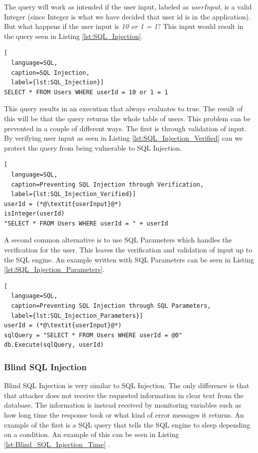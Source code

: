 The query will work as intended if the user input, labeled as \textit{userInput}, is a valid Integer (since Integer is what we have decided that user id is in the application). But what happens if the user input is \textit{10 or 1 = 1}? This input would result in the query seen in Listing \ref{lst:SQL_Injection}.

\hfill
\begin{lstlisting}[
  language=SQL,
  caption=SQL Injection,
  label={lst:SQL_Injection}]
SELECT * FROM Users WHERE userId = 10 or 1 = 1
\end{lstlisting}
\hfill

This query results in an execution that always evaluates to true. The result of this will be that the query returns the whole table of users. This problem can be prevented in a couple of different ways. The first is through validation of input. By verifying user input as seen in Listing \ref{lst:SQL_Injection_Verified} can we protect the query from being vulnerable to SQL Injection.

\hfill
\begin{lstlisting}[
  language=SQL,
  caption=Preventing SQL Injection through Verification,
  label={lst:SQL_Injection_Verified}]
userId = (*@\textit{userInput}@*)
isInteger(userId)
"SELECT * FROM Users WHERE userId = " + userId
\end{lstlisting}
\hfill

A second common alternative is to use SQL Parameters which handles the verification for the user. This leaves the verification and validation of input up to the SQL engine. An example written with SQL Parameters can be seen in Listing \ref{lst:SQL_Injection_Parameters}.

\hfill
\begin{lstlisting}[
  language=SQL,
  caption=Preventing SQL Injection through SQL Parameters,
  label={lst:SQL_Injection_Parameters}]
userId = (*@\textit{userInput}@*)
sqlQuery = "SELECT * FROM Users WHERE userId = @0"
db.Execute(sqlQuery, userId)
\end{lstlisting}



\subsubsection{Blind SQL Injection}
Blind SQL Injection is very similar to SQL Injection. The only difference is that that attacker does not receive the requested information in clear text from the database. The information is instead received by monitoring variables such as how long time the response took or what kind of error messages it returns. An example of the first is a SQL query that tells the SQL engine to sleep depending on a condition. An example of this can be seen in Listing \ref{lst:Blind_SQL_Injection_Time} \parencite{JustinClarke-Salt2009SIAa, Secure_Web}.

